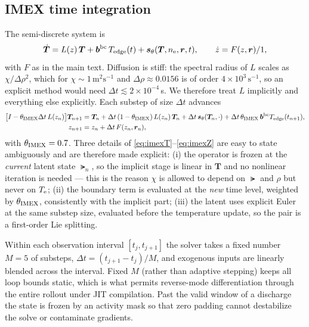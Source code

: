 \subsection{IMEX time integration}
\label{app:num-imex}

The semi-discrete system is
\begin{equation}
\dot{\bm{T}} = L(z)\,\bm{T} + \bm{b}^{\mathrm{bc}}\,T_{\mathrm{edge}}(t)
             + \bm{s}_\theta(\bm{T}, n_{\mathrm{e}}, \bm{r}, t),
\qquad
\dot{z} = F(z, \bm{r})/1 ,
\label{eq:semidiscrete}
\end{equation}
with $F$ as in the main text. Diffusion is stiff: the spectral radius of
$L$ scales as $\chi/\Delta\rho^2$, which for
$\chi \sim 1\,\mathrm{m^2 s^{-1}}$ and $\Delta\rho \approx 0.0156$ is of
order $4\times10^{3}\,\mathrm{s^{-1}}$, so an explicit method would need
$\Delta t \lesssim 2\times10^{-4}\,$s. We therefore treat $L$ implicitly
and everything else explicitly. Each substep of size $\Delta t$ advances
\begin{align}
\big[I - \theta_{\mathrm{IMEX}} \Delta t\, L(z_n)\big] \bm{T}_{n+1}
&= \bm{T}_n
 + \Delta t\,(1-\theta_{\mathrm{IMEX}})\, L(z_n)\,\bm{T}_n
 + \Delta t\, \bm{s}_\theta(\bm{T}_n,\cdot)
 + \Delta t\, \theta_{\mathrm{IMEX}}\, \bm{b}^{\mathrm{bc}} T_{\mathrm{edge}}(t_{n+1}),
\label{eq:imexT}\\
z_{n+1} &= z_n + \Delta t\, F(z_n, \bm{r}_n),
\label{eq:imexZ}
\end{align}
with $\theta_{\mathrm{IMEX}} = 0.7$. Three details of \eqref{eq:imexT}--\eqref{eq:imexZ}
are easy to state ambiguously and are therefore made explicit:
(i) the operator is frozen at the \emph{current} latent state $\lat_n$, so
the implicit stage is linear in $\bm{T}$ and no nonlinear iteration is
needed --- this is the reason $\chi$ is allowed to depend on $\lat$ and
$\rho$ but never on $T_{\mathrm{e}}$;
(ii) the boundary term is evaluated at the \emph{new} time level, weighted
by $\theta_{\mathrm{IMEX}}$, consistently with the implicit part;
(iii) the latent uses explicit Euler at the same substep size, evaluated
before the temperature update, so the pair is a first-order Lie splitting.

Within each observation interval $[t_j, t_{j+1}]$ the solver takes a fixed
number $M = 5$ of substeps, $\Delta t = (t_{j+1}-t_j)/M$, and exogenous
inputs are linearly blended across the interval. Fixed $M$ (rather than
adaptive stepping) keeps all loop bounds static, which is what permits
reverse-mode differentiation through the entire rollout under JIT
compilation. Past the valid window of a discharge the state is frozen by
an activity mask so that zero padding cannot destabilize the solve or
contaminate gradients.

